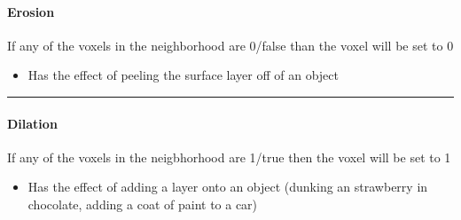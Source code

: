 \documentclass[letterpaper,10pt,english]{sphinxmanual}
\begin{document}
\paragraph{Erosion}
\label{\detokenize{04-BasicSegmentation_Part2:erosion}}
\sphinxAtStartPar
If any of the voxels in the neighborhood are 0/false than the voxel will be set to 0
\begin{itemize}
\item {} 
\sphinxAtStartPar
Has the effect of peeling the surface layer off of an object

\end{itemize}


\bigskip\hrule\bigskip



\paragraph{Dilation}
\label{\detokenize{04-BasicSegmentation_Part2:dilation}}
\sphinxAtStartPar
If any of the voxels in the neigbhorhood are 1/true then the voxel will be set to 1
\begin{itemize}
\item {} 
\sphinxAtStartPar
Has the effect of adding a layer onto an object (dunking an strawberry in chocolate, adding a coat of paint to a car)

\end{itemize}
\end{document}
